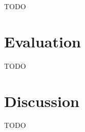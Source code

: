 \documentclass[a4paper,10pt,twoside]{IEEEtran}
\begin{document}
TODO

\section{Evaluation}
\label{sec:evaluation}

TODO

\section{Discussion}
\label{sec:discussion}

TODO



\newpage




\newpage
\appendix
\end{document}
